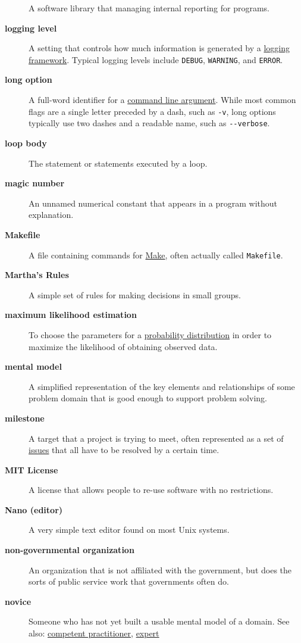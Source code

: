 \documentclass[
]{krantz}
\begin{document}
\begin{description}
A software library that managing internal reporting for programs.
\item[\textbf{logging level}]
A setting that controls how much information is generated by a \protect\hyperlink{logging_framework}{logging framework}. Typical logging levels include \texttt{DEBUG}, \texttt{WARNING}, and \texttt{ERROR}.
\item[\textbf{long option}]
A full-word identifier for a \protect\hyperlink{command_line_argument}{command line argument}. While most common flags are a single letter preceded by a dash, such as \texttt{-v}, long options typically use two dashes and a readable name, such as \texttt{-\/-verbose}.
\item[\textbf{loop body}]
The statement or statements executed by a loop.
\item[\textbf{magic number}]
An unnamed numerical constant that appears in a program without explanation.
\item[\textbf{Makefile}]
A file containing commands for \protect\hyperlink{make}{Make}, often actually called \texttt{Makefile}.
\item[\textbf{Martha's Rules}]
A simple set of rules for making decisions in small groups.
\item[\textbf{maximum likelihood estimation}]
To choose the parameters for a \protect\hyperlink{probability_distribution}{probability distribution} in order to maximize the likelihood of obtaining observed data.
\item[\textbf{mental model}]
A simplified representation of the key elements and relationships of some problem domain that is good enough to support problem solving.
\item[\textbf{milestone}]
A target that a project is trying to meet, often represented as a set of \protect\hyperlink{issue}{issues} that all have to be resolved by a certain time.
\item[\textbf{MIT License}]
A license that allows people to re-use software with no restrictions.
\item[\textbf{Nano (editor)}]
A very simple text editor found on most Unix systems.
\item[\textbf{non-governmental organization}]
An organization that is not affiliated with the government, but does the sorts of public service work that governments often do.
\item[\textbf{novice}]
Someone who has not yet built a usable mental model of a domain. See also: \protect\hyperlink{competent_practitioner}{competent practitioner}, \protect\hyperlink{expert}{expert}

\end{description}
\end{document}
